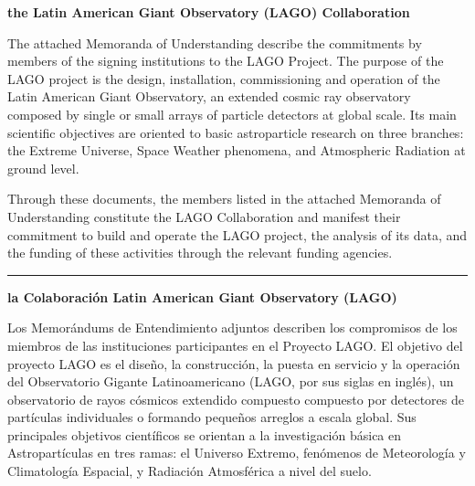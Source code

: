 \documentclass[12pt,a4paper]{article}
\newif\ifintro
\begin{document}


\ifintro
\begin{center}
{\Large\bf 
  the Latin American Giant Observatory (LAGO) Collaboration\\
  \vspace*{0.7cm}
  \datesign
}
\end{center}
\vspace*{1.5cm}

The attached Memoranda of Understanding describe the commitments by members of
the signing institutions to the LAGO Project. The purpose of the LAGO project
is the design, installation, commissioning and operation of the Latin American Giant
Observatory, an extended cosmic ray observatory composed by single or small
arrays of particle detectors at global scale. Its main scientific objectives
are oriented to basic astroparticle research on three branches: the Extreme Universe, Space
Weather phenomena, and Atmospheric Radiation at ground level.

Through these documents, the members listed in the attached Memoranda of
Understanding constitute the LAGO Collaboration and manifest their commitment
to build and operate the LAGO project, the analysis of its data,
and the funding of these activities through the relevant funding agencies.

\vspace*{1cm}\begin{center}\noindent\rule{0.9\textwidth}{0.4pt}\end{center}\vspace*{1cm}

\begin{center}
{\Large\bf 
  la Colaboración Latin American Giant Observatory (LAGO)\\
  \vspace*{0.7cm}
  \datesign
}
\end{center}
\vspace*{1.5cm}

Los Memorándums de Entendimiento adjuntos describen los compromisos de los
miembros de las instituciones participantes en el Proyecto LAGO. El objetivo
del proyecto LAGO es el diseño, la construcción, la puesta en servicio y la
operación del Observatorio Gigante Latinoamericano (LAGO, por sus siglas en
inglés), un observatorio de rayos cósmicos extendido compuesto compuesto por
detectores de partículas individuales o formando pequeños arreglos a escala
global. Sus principales objetivos científicos se orientan a la investigación
básica en Astropartículas en tres ramas: el Universo Extremo, fenómenos de
Meteorología y Climatología Espacial, y Radiación Atmosférica a nivel del
suelo. 
\end{document}
